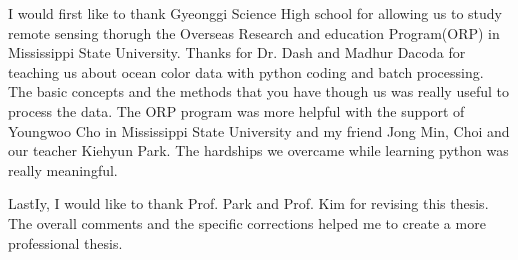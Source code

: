 \begin{acknowledgements}


 I would first like to thank Gyeonggi Science High school for allowing us to study remote sensing thorugh the Overseas Research and education Program(ORP) in Mississippi State University. Thanks for Dr. Dash and Madhur Dacoda for teaching us about ocean color data with python coding and batch processing. The basic concepts and the methods that you have though us was really useful to process the data. The ORP program was more helpful with the support of Youngwoo Cho in Mississippi State University and my friend Jong Min, Choi and our teacher Kiehyun Park. The hardships we overcame while learning python was really meaningful.
 
 LastIy, I would like to thank Prof. Park and Prof. Kim for revising this thesis. The overall comments and the specific corrections helped me to create a more professional thesis.  








\end{acknowledgements}

